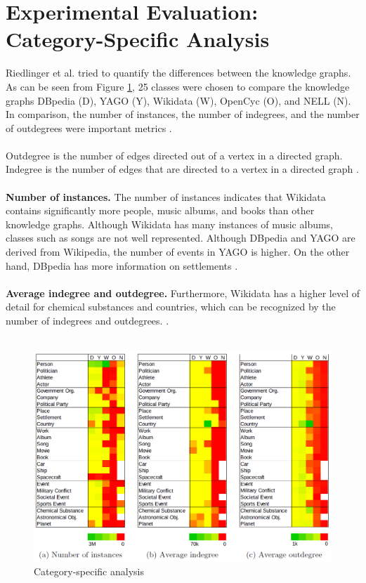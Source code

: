 ﻿\documentclass[11pt,titlepage,oneside,openany]{book}
\begin{document}
\section{Experimental Evaluation: Category-Specific Analysis}
Riedlinger et al. \cite{Ringler2017OneKG} tried to quantify the differences between the knowledge graphs. As can be seen from Figure \ref{fig:category-specific-analysis}, 25 classes were chosen to compare the knowledge graphs DBpedia (D), YAGO (Y), Wikidata (W), OpenCyc (O), and NELL (N). In comparison, the number of instances, the number of indegrees, and the number of outdegrees were important metrics \cite{Ringler2017OneKG}. 
\\
\\
Outdegree is the number of edges directed out of a vertex in a directed graph. Indegree is the number of edges that are directed to a vertex in a directed graph \cite{Ringler2017OneKG}.
\\
\\
\textbf{Number of instances.} The number of instances indicates that Wikidata contains significantly more people, music albums, and books than other knowledge graphs. Although Wikidata has many instances of music albums, classes such as songs are not well represented. Although DBpedia and YAGO are derived from Wikipedia, the number of events in YAGO is higher. On the other hand, DBpedia has more information on settlements \cite{Ringler2017OneKG}.
\\
\\
\textbf{Average indegree and outdegree.} Furthermore, Wikidata has a higher level of detail for chemical substances and countries, which can be recognized by the number of indegrees and outdegrees. \cite{Ringler2017OneKG}.
\\
\\

\begin{figure}
	\begin{center}
	\includegraphics[width=13cm]{./figures/category-specific-analysis.png}
	\caption[Category-specific analysis]{Category-specific analysis \cite{Ringler2017OneKG}}
	\label{fig:category-specific-analysis}
	\end{center}
\end{figure}
\end{document}
